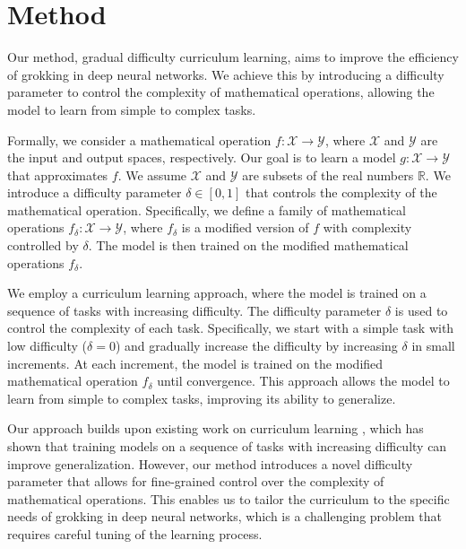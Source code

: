\documentclass{article} %
\begin{document}
\section{Method}
\label{sec:method}

Our method, gradual difficulty curriculum learning, aims to improve the efficiency of grokking in deep neural networks. We achieve this by introducing a difficulty parameter to control the complexity of mathematical operations, allowing the model to learn from simple to complex tasks.

Formally, we consider a mathematical operation $f: \mathcal{X} \rightarrow \mathcal{Y}$, where $\mathcal{X}$ and $\mathcal{Y}$ are the input and output spaces, respectively. Our goal is to learn a model $g: \mathcal{X} \rightarrow \mathcal{Y}$ that approximates $f$. We assume $\mathcal{X}$ and $\mathcal{Y}$ are subsets of the real numbers $\mathbb{R}$. We introduce a difficulty parameter $\delta \in [0, 1]$ that controls the complexity of the mathematical operation. Specifically, we define a family of mathematical operations $f_\delta: \mathcal{X} \rightarrow \mathcal{Y}$, where $f_\delta$ is a modified version of $f$ with complexity controlled by $\delta$. The model is then trained on the modified mathematical operations $f_\delta$.

We employ a curriculum learning approach, where the model is trained on a sequence of tasks with increasing difficulty. The difficulty parameter $\delta$ is used to control the complexity of each task. Specifically, we start with a simple task with low difficulty ($\delta = 0$) and gradually increase the difficulty by increasing $\delta$ in small increments. At each increment, the model is trained on the modified mathematical operation $f_\delta$ until convergence. This approach allows the model to learn from simple to complex tasks, improving its ability to generalize.

Our approach builds upon existing work on curriculum learning \citep{goodfellow2016deep}, which has shown that training models on a sequence of tasks with increasing difficulty can improve generalization. However, our method introduces a novel difficulty parameter that allows for fine-grained control over the complexity of mathematical operations. This enables us to tailor the curriculum to the specific needs of grokking in deep neural networks, which is a challenging problem that requires careful tuning of the learning process.
\end{document}
